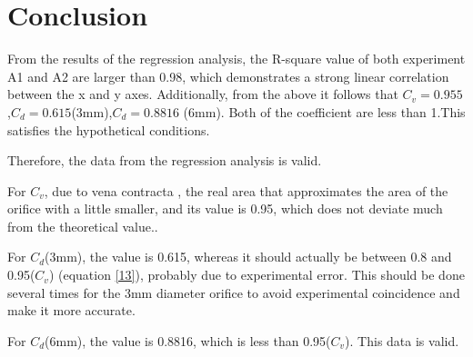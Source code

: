 \section{Conclusion}
\label{sec:conclusion}


From the results of the regression analysis, 
the R-square value of both experiment A1 and A2 are larger than 0.98, 
which demonstrates a strong linear correlation between the x and y axes.
Additionally, from the above it follows that $C_v = 0.955$,$C_d=0.615$(3mm),$C_d=0.8816$
(6mm). Both of the coefficient are less than 1.This satisfies the hypothetical conditions.

Therefore, the data from the regression analysis is valid.

For $C_v$, due to vena contracta , the real area that approximates the area 
of the orifice with a little smaller, 
and its value is 0.95, which does not deviate much from the theoretical value..

For $C_d$(3mm), the value is 0.615, whereas it should actually be between 0.8 and 0.95($C_v$) 
(equation \ref{13}), probably due to experimental error. 
This should be done several times for the 3mm diameter orifice to avoid 
experimental coincidence and make it more accurate.

For $C_d$(6mm), the value is 0.8816, which is less than 0.95($C_v$). This data is valid.